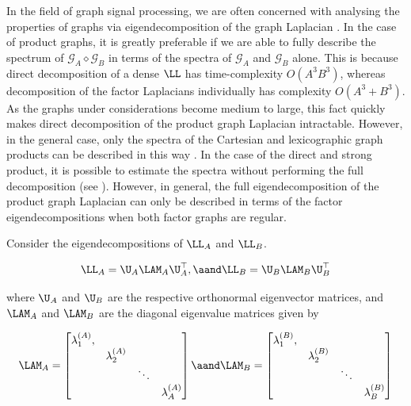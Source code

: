 In the field of graph signal processing, we are often concerned with analysing the properties of graphs via eigendecomposition of the graph Laplacian \citep{Mieghem2010}. In the case of product graphs, it is greatly preferable if we are able to fully describe the spectrum of $\mathcal{G}_A \diamond \mathcal{G}_B$ in terms of the spectra of $\mathcal{G}_A$ and $\mathcal{G}_B$ alone. This is because direct decomposition of a dense $\LL$ has time-complexity $O(A^3B^3)$, whereas decomposition of the factor Laplacians individually has complexity $O(A^3 + B^3)$. As the graphs under considerations become medium to large, this fact quickly makes direct decomposition of the product graph Laplacian intractable. However, in the general case, only the spectra of the Cartesian and lexicographic graph products can be described in this way \citep{Barik2018}. In the case of the direct and strong product, it is possible to estimate the spectra without performing the full decomposition (see \citep{Sayama2016}). However, in general, the full eigendecomposition of the product graph Laplacian can only be described in terms of the factor eigendecompositions when both factor graphs are regular.


Consider the eigendecompositions of $\LL_A$ and $\LL_B$.

\begin{equation}
    \LL_A = \U_A \LAM_A \U_A^\top, \aand \LL_B = \U_B \LAM_B \U_B^\top
\end{equation}

where $\U_A$ and $\U_B$ are the respective orthonormal eigenvector matrices, and $\LAM_A$ and $\LAM_B$ are the diagonal eigenvalue matrices given by

\begin{equation}
    \LAM_A = \begin{bmatrix}
        \lambda_1^{(A)}, &                 &        &                 \\
                         & \lambda_2^{(A)} &        &                 \\
                         &                 & \ddots &                 \\
                         &                 &        & \lambda_A^{(A)} \\
    \end{bmatrix}
    \aand
    \LAM_B = \begin{bmatrix}
        \lambda_1^{(B)}, &                 &        &                 \\
                         & \lambda_2^{(B)} &        &                 \\
                         &                 & \ddots &                 \\
                         &                 &        & \lambda_B^{(B)} \\
    \end{bmatrix}
\end{equation}

